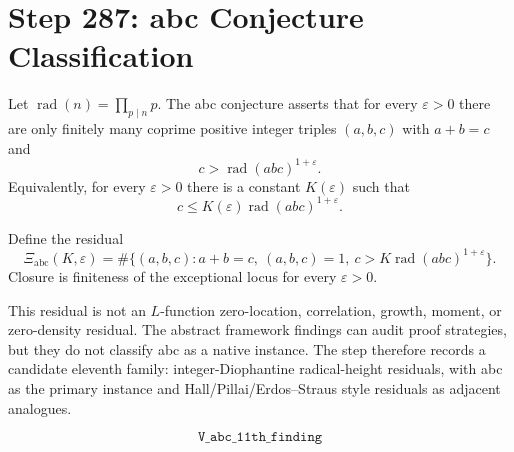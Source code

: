 \section*{Step 287: abc Conjecture Classification}

Let $\operatorname{rad}(n)=\prod_{p\mid n}p$.  The abc conjecture asserts that for every
$\varepsilon>0$ there are only finitely many coprime positive integer triples
$(a,b,c)$ with $a+b=c$ and
\[
  c>\operatorname{rad}(abc)^{1+\varepsilon}.
\]
Equivalently, for every $\varepsilon>0$ there is a constant $K(\varepsilon)$ such that
\[
  c\le K(\varepsilon)\operatorname{rad}(abc)^{1+\varepsilon}.
\]

Define the residual
\[
\Xi_{\mathrm{abc}}(K,\varepsilon)=
\#\{(a,b,c): a+b=c,\ (a,b,c)=1,\ c>K\operatorname{rad}(abc)^{1+\varepsilon}\}.
\]
Closure is finiteness of the exceptional locus for every $\varepsilon>0$.

This residual is not an $L$-function zero-location, correlation, growth, moment, or
zero-density residual.  The abstract framework findings can audit proof strategies, but
they do not classify abc as a native instance.  The step therefore records a candidate
eleventh family: integer-Diophantine radical-height residuals, with abc as the primary
instance and Hall/Pillai/Erdos--Straus style residuals as adjacent analogues.

\[
\boxed{\texttt{V\_abc\_11th\_finding}}
\]
